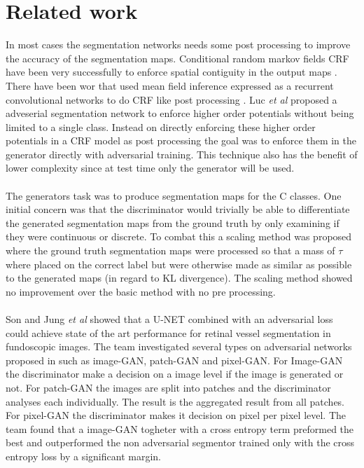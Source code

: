 \documentclass[a4paper,11pt]{article}
\begin{document}
\section{Related work}
In most cases the segmentation networks needs some post processing to improve the accuracy of the segmentation maps. Conditional random markov fields CRF have been very successfully to enforce spatial contiguity in the output maps \cite{arnab_higher_2015, luc_semantic_2016}. There have been wor that used mean field inference expressed as a recurrent convolutional networks to do CRF like post processing \cite{schwing_fully_2015, zheng_conditional_2015}. Luc \textit{et al} \cite{luc_semantic_2016} proposed a adveserial segmentation network to enforce higher order potentials without being limited to a single class. Instead on directly enforcing these higher order potentials in a CRF model as post processing the goal was to enforce them in the generator directly with adversarial training. This technique also has the benefit of lower complexity since at test time only the generator will be used.\\
\\
The generators task was to produce segmentation maps for the C classes. One initial concern was that the discriminator would trivially be able to differentiate the generated segmentation maps from the ground truth by only examining if they were continuous or discrete. To combat this a scaling method was proposed where the ground truth segmentation maps were processed so that a mass of $\tau$ where placed on the correct label but were otherwise made as similar as possible to the generated maps (in regard to KL divergence). The scaling method showed no improvement over the basic method with no pre processing.\\
\\
Son and Jung \textit{et al} \cite{son_retinal_2017} showed that a U-NET combined with an adversarial loss could achieve state of the art performance for retinal vessel segmentation in fundoscopic images. The team investigated several types on adversarial networks proposed in \cite{isola_image--image_2016} such as image-GAN, patch-GAN and pixel-GAN. For Image-GAN the discriminator make a decision on a image level if the image is generated or not. For patch-GAN the images are split into patches and the discriminator analyses each individually. The result is the aggregated result from all patches. For pixel-GAN the discriminator makes it decision on pixel per pixel level. The team found that a image-GAN togheter with a cross entropy term preformed the best and outperformed the non adversarial segmentor trained only with the cross entropy loss by a significant margin.\\
\\
\end{document}
